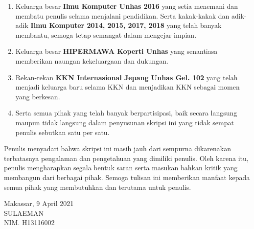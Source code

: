 \begin{enumerate}[topsep=0pt,itemsep=0pt,partopsep=0pt, parsep=0pt]
    \item Keluarga besar \textbf{Ilmu Komputer Unhas 2016} yang setia menemani dan membatu penulis selama menjalani pendidikan. Serta kakak-kakak dan adik-adik \textbf{Ilmu Komputer 2014, 2015, 2017, 2018} yang telah banyak membantu, semoga tetap semangat dalam mengejar impian.

    \item Keluarga besar \textbf{HIPERMAWA Koperti Unhas} yang senantiasa memberikan naungan kekeluargaan dan dukungan.

    \item Rekan-rekan \textbf{KKN Internasional Jepang Unhas Gel. 102} yang telah menjadi keluarga baru selama KKN dan menjadikan KKN sebagai momen yang berkesan.

    \item Serta semua pihak yang telah banyak berpartisipasi, baik secara langsung maupun tidak langsung dalam penyusunan skripsi ini yang tidak sempat penulis sebutkan satu per satu.
\end{enumerate}

Penulis menyadari bahwa skripsi ini masih jauh dari sempurna dikarenakan terbatasnya pengalaman dan pengetahuan yang dimiliki penulis. Oleh karena itu, penulis mengharapkan segala bentuk saran serta masukan bahkan kritik yang membangun dari berbagai pihak. Semoga tulisan ini memberikan manfaat kepada semua pihak yang membutuhkan dan terutama untuk penulis.

\vspace{1cm}
\begin{flushright}
    Makassar, 9 April 2021\\
    \vspace{2.5cm}
    {SULAEMAN}\\
    NIM. {H13116002}
\end{flushright}

